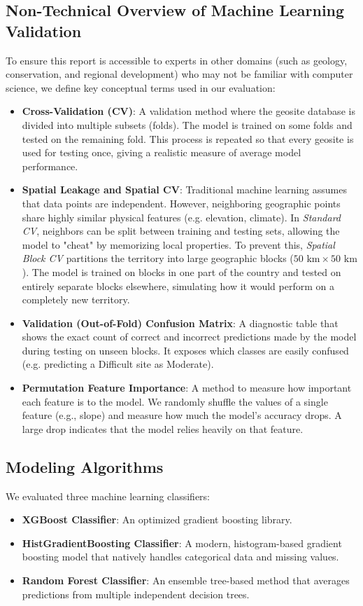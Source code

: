 \documentclass[11pt,twocolumn,a4paper]{article}
\begin{document}
\subsection{Non-Technical Overview of Machine Learning Validation}
To ensure this report is accessible to experts in other domains (such as geology, conservation, and regional development) who may not be familiar with computer science, we define key conceptual terms used in our evaluation:
\begin{itemize}
    \item \textbf{Cross-Validation (CV)}: A validation method where the geosite database is divided into multiple subsets (folds). The model is trained on some folds and tested on the remaining fold. This process is repeated so that every geosite is used for testing once, giving a realistic measure of average model performance.
    \item \textbf{Spatial Leakage and Spatial CV}: Traditional machine learning assumes that data points are independent. However, neighboring geographic points share highly similar physical features (e.g. elevation, climate). In \emph{Standard CV}, neighbors can be split between training and testing sets, allowing the model to "cheat" by memorizing local properties. To prevent this, \emph{Spatial Block CV} partitions the territory into large geographic blocks ($50\text{ km} \times 50\text{ km}$). The model is trained on blocks in one part of the country and tested on entirely separate blocks elsewhere, simulating how it would perform on a completely new territory.
    \item \textbf{Validation (Out-of-Fold) Confusion Matrix}: A diagnostic table that shows the exact count of correct and incorrect predictions made by the model during testing on unseen blocks. It exposes which classes are easily confused (e.g. predicting a Difficult site as Moderate).
    \item \textbf{Permutation Feature Importance}: A method to measure how important each feature is to the model. We randomly shuffle the values of a single feature (e.g., slope) and measure how much the model's accuracy drops. A large drop indicates that the model relies heavily on that feature.
\end{itemize}

\subsection{Modeling Algorithms}
We evaluated three machine learning classifiers:
\begin{itemize}
    \item \textbf{XGBoost Classifier}: An optimized gradient boosting library.
    \item \textbf{HistGradientBoosting Classifier}: A modern, histogram-based gradient boosting model that natively handles categorical data and missing values.
    \item \textbf{Random Forest Classifier}: An ensemble tree-based method that averages predictions from multiple independent decision trees.
\end{itemize}
\end{document}
